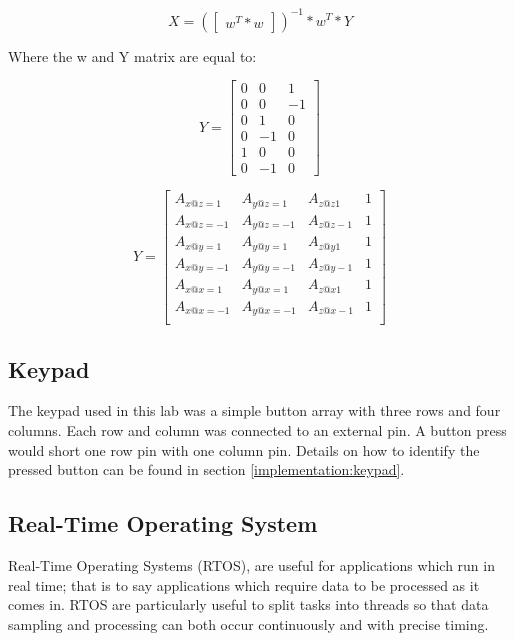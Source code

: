 \documentclass[12pt]{article}
\begin{document}
\begin{equation} \label{cal_eq:2}
 X = (\begin{bmatrix} w^{T}*w \end{bmatrix})^{-1}*w^{T} * Y
 \end{equation}

Where the w and Y matrix are equal to:

\begin{equation} \label{cal_eq:3}
 Y = \begin{bmatrix} 0 & 0 & 1  \\
            0 & 0 & -1 \\
                      0 & 1 & 0  \\
                      0 & -1 & 0 \\
                      1 & 0 & 0  \\
                      0 & -1 & 0
                      \end{bmatrix}
\end{equation}

\begin{equation} \label{cal_eq:4}
 Y = \begin{bmatrix} A_{x@z=1} & A_{y@z=1} & A_{z@z1} & 1 \\
            A_{x@z=-1} & A_{y@z=-1} & A_{z@z-1} & 1 \\
                      A_{x@y=1} & A_{y@y=1} & A_{z@y1} & 1 \\
                      A_{x@y=-1} & A_{y@y=-1} & A_{z@y-1} & 1 \\
                      A_{x@x=1} & A_{y@x=1} & A_{z@x1} & 1 \\
                      A_{x@x=-1} & A_{y@x=-1} & A_{z@x-1} & 1 \\
                      \end{bmatrix}
\end{equation}
\subsection{Keypad}
The keypad used in this lab was a simple button array with three rows and four columns. Each row and column was connected to an external pin. A button press would short one row pin with one column pin. Details on how to identify the pressed button can be found in section \ref{implementation:keypad}.


\subsection{Real-Time Operating System}
Real-Time Operating Systems (RTOS), are useful for applications which run in real time; that is to say applications which require data to be processed as it comes in. RTOS are particularly useful to split tasks into threads so that data sampling and processing can both occur continuously and with precise timing.
\end{document}
